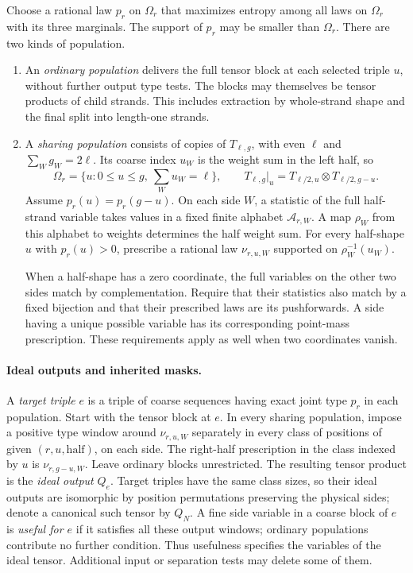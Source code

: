 Choose a rational law $p_r$ on $\Omega_r$ that maximizes entropy among
all laws on $\Omega_r$ with its three marginals.  The support of $p_r$
may be smaller than $\Omega_r$.  There are two kinds of population.

\begin{enumerate}
\item An \emph{ordinary population} delivers the full tensor block at
each selected triple $u$, without further output type tests.  The
blocks may themselves be tensor products of child strands.  This
includes extraction by whole-strand shape and the final split into
length-one strands.
\item A \emph{sharing population} consists of copies of $T_{\ell,g}$,
with even $\ell$ and $\sum_Wg_W=2\ell$.  Its coarse index $u_W$ is
the weight sum in the left half, so
\[
 \Omega_r=\{u:0\le u\le g,\ \textstyle\sum_Wu_W=\ell\},
 \qquad T_{\ell,g}|_u=T_{\ell/2,u}\otimes T_{\ell/2,g-u}.
\]
Assume $p_r(u)=p_r(g-u)$.  On each side $W$, a statistic of the full
half-strand variable takes values in a fixed finite alphabet
$\mathcal A_{r,W}$.  A map $\rho_W$ from this alphabet to weights
determines the half weight sum.  For every half-shape $u$ with
$p_r(u)>0$, prescribe a rational law $\nu_{r,u,W}$ supported on
$\rho_W^{-1}(u_W)$.

When a half-shape has a zero coordinate, the full variables on the
other two sides match by complementation.  Require that their
statistics also match by a fixed bijection and that their prescribed
laws are its pushforwards.  A side having a unique possible variable
has its corresponding point-mass prescription.  These requirements
apply as well when two coordinates vanish.
\end{enumerate}

\paragraph{Ideal outputs and inherited masks.}
A \emph{target triple} $e$ is a triple of coarse sequences having exact
joint type $p_r$ in each population.  Start with the tensor block at $e$.
In every sharing population, impose a positive type window around
$\nu_{r,u,W}$ separately in every class of positions of given
$(r,u,\text{half})$, on each side.  The right-half prescription in the
class indexed by $u$ is $\nu_{r,g-u,W}$.  Leave ordinary blocks
unrestricted.  The resulting tensor product is the \emph{ideal output}
$Q_e$.  Target triples have the same class sizes, so
their ideal outputs are isomorphic by position permutations preserving
the physical sides; denote a canonical such tensor by $Q_N$.
A fine side variable in a coarse block of $e$ is \emph{useful for $e$}
if it satisfies all these output windows; ordinary populations
contribute no further condition.  Thus usefulness specifies the
variables of the ideal tensor.  Additional input or separation tests
may delete some of them.

